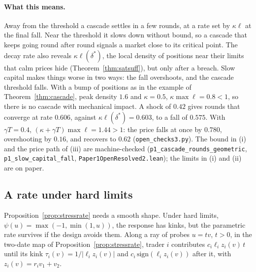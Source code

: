 \paragraph{What this means.} Away from the threshold a cascade settles in a few rounds, at a rate set by $\kappa\ell$ at the final fall. Near the threshold it slows down without bound, so a cascade that keeps going round after round signals a market close to its critical point. The decay rate also reveals $\kappa\ell(\delta^*)$, the local density of positions near their limits that calm prices hide (Theorem~\ref{thm:satsuff}), but only after a breach. Slow capital makes things worse in two ways: the fall overshoots, and the cascade threshold falls. With a bump of positions as in the example of Theorem~\ref{thm:cascade}, peak density $1.6$ and $\kappa=0.5$, $\kappa\max\ell=0.8<1$, so there is no cascade with mechanical impact. A shock of $0.42$ gives rounds that converge at rate $0.606$, against $\kappa\ell(\delta^*)=0.603$, to a fall of $0.575$. With $\gamma T=0.4$, $(\kappa+\gamma T)\max\ell=1.44>1$: the price falls at once by $0.780$, overshooting by $0.16$, and recovers to $0.62$ (\nolinkurl{open_checks3.py}). The bound in (i) and the price path of (iii) are machine-checked (\texttt{p1\_cascade\_rounds\_geometric}, \texttt{p1\_slow\_capital\_fall}, \nolinkurl{Paper1OpenResolved2.lean}); the limits in (i) and (ii) are on paper.

\subsection{A rate under hard limits}

Proposition~\ref{prop:stressrate} needs a smooth shape. Under hard limits, $\psi(u)=\max(-1,\min(1,u))$, the response has kinks, but the parametric rate survives if the design avoids them. Along a ray of probes $u=tv$, $t>0$, in the two-date map of Proposition~\ref{prop:stressrate}, trader $i$ contributes $c_i\ell_iz_i(v)\,t$ until its kink $\tau_i(v)=1/|\ell_iz_i(v)|$ and $c_i\,\mathrm{sign}(\ell_iz_i(v))$ after it, with $z_i(v)=r_iv_1+v_2$.

